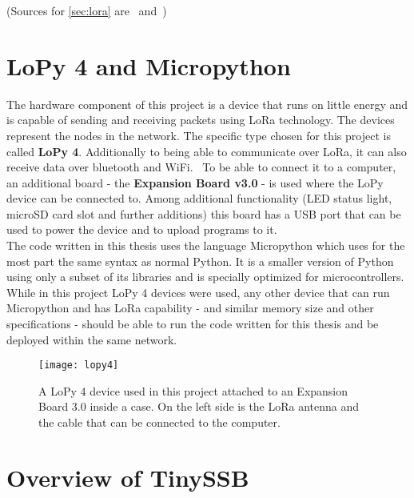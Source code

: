 (Sources for \cref{sec:lora} are~\cite{10.1007/978-3-030-01168-0_11} and~\cite{10.1145/3293534})

\section{LoPy 4 and Micropython}
The hardware component of this project is a device that runs on little energy and is capable of sending and receiving packets using LoRa technology. The devices represent the nodes in the network. The specific type chosen for this project is called \textbf{LoPy 4}. Additionally to being able to communicate over LoRa, it can also receive data over bluetooth and WiFi.~\cite{LoPy} To be able to connect it to a computer, an additional board - the \textbf{Expansion Board v3.0} - is used where the LoPy device can be connected to. Among additional functionality (LED status light, microSD card slot and further additions) this board has a USB port that can be used to power the device and to upload programs to it.~\cite{ExpansionBoard} \\
The code written in this thesis uses the language Micropython which uses for the most part the same syntax as normal Python. It is a smaller version of Python using only a subset of its libraries and is specially optimized for microcontrollers. \cite{Micropython} \\
While in this project LoPy 4 devices were used, any other device that can run Micropython and has LoRa capability - and similar memory size and other specifications - should be able to run the code written for this thesis and be deployed within the same network.
\begin{figure}
\centering
\texttt{[image: lopy4]}
\caption{A LoPy 4 device used in this project attached to an Expansion Board 3.0 inside a case. On the left side is the LoRa antenna and the cable that can be connected to the computer.}
\label{fig:lopy4}
\end{figure}

\newpage

\section{Overview of TinySSB}
\label{sec:tiny}

